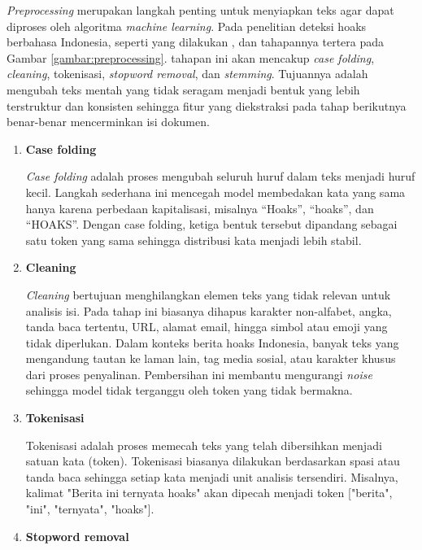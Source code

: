 \textit{Preprocessing} merupakan langkah penting untuk menyiapkan teks agar dapat diproses oleh algoritma \textit{machine learning}. Pada penelitian deteksi hoaks berbahasa Indonesia, seperti yang dilakukan \textcite{pratiwi2022hoax}, dan tahapannya tertera pada Gambar \ref{gambar:preprocessing}.
tahapan ini akan mencakup \textit{case folding}, \textit{cleaning}, tokenisasi, \textit{stopword removal}, dan \textit{stemming}. Tujuannya adalah mengubah teks mentah yang tidak seragam menjadi bentuk yang lebih terstruktur dan konsisten sehingga fitur yang diekstraksi pada tahap berikutnya benar-benar mencerminkan isi dokumen.
\begin{enumerate}
	
	\item \textbf{Case folding}

	\textit{Case folding} adalah proses mengubah seluruh huruf dalam teks menjadi huruf kecil. Langkah sederhana ini mencegah model membedakan kata yang sama hanya karena perbedaan kapitalisasi, misalnya “Hoaks”, “hoaks”, dan “HOAKS”. Dengan case folding, ketiga bentuk tersebut dipandang sebagai satu token yang sama sehingga distribusi kata menjadi lebih stabil.\\

	\item \textbf{Cleaning}  

	\textit{Cleaning} bertujuan menghilangkan elemen teks yang tidak relevan untuk analisis isi. Pada tahap ini biasanya dihapus karakter non-alfabet, angka, tanda baca tertentu, URL, alamat email, hingga simbol atau emoji yang tidak diperlukan. Dalam konteks berita hoaks Indonesia, banyak teks yang mengandung tautan ke laman lain, tag media sosial, atau karakter khusus dari proses penyalinan. Pembersihan ini membantu mengurangi \textit{noise} sehingga model tidak terganggu oleh token yang tidak bermakna.\\

	\item \textbf{Tokenisasi}  

	Tokenisasi adalah proses memecah teks yang telah dibersihkan menjadi satuan kata (token). Tokenisasi biasanya dilakukan berdasarkan spasi atau tanda baca sehingga setiap kata menjadi unit analisis tersendiri. Misalnya, kalimat "Berita ini ternyata hoaks" akan dipecah menjadi token ["berita", "ini", "ternyata", "hoaks"].\\

	\item \textbf{Stopword removal}  


\end{enumerate}
